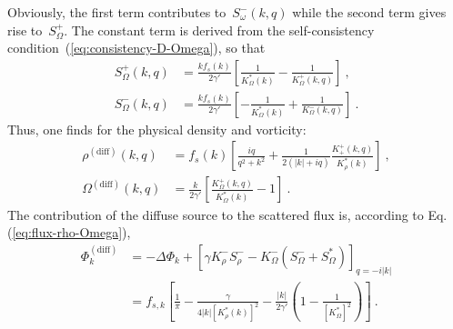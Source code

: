 \documentclass[preprint,aps,eqsecnum]{revtex4-1}
\newcommand{\fplus}[1]{{#1}^{+}}
\newcommand{\fminus}[1]{{#1}^{-}}
\begin{document}
Obviously, the first term contributes to~$\fminus{S}_\omega(k, q)$
while the second term gives rise to~$\fplus{S}_\Omega$. The constant
term is derived from the self-consistency
condition~(\ref{eq:consistency-D-Omega}), so that
\begin{align}
  \fplus{S}_\Omega(k, q) &= \frac{k f_s(k)}{2\gamma'}
  \left[\frac{1}{K^\ast_\Omega(k)} - \frac{1}{\fplus{K}_\Omega(k, q)}
  \right] \ , \\\nonumber
  \fminus{S}_\Omega(k, q) &= \frac{k f_s(k)}{2\gamma'}
  \left[-\frac{1}{K^\ast_\Omega(k)} + \frac{1}{\fminus{K}_\Omega(k, q)}
  \right] \ .
\end{align}
Thus, one finds for the physical density and vorticity:
\begin{align}
  \rho^\mathrm{(diff)}(k, q) &= f_s(k)
  \left[\frac{iq}{q^2 + k^2} + \frac{1}{2(|k| + iq)}
   \frac{\fplus{K}_{+}(k, q)}{K_\rho^\ast(k)}
  \right]
  \ , \\\nonumber
  \Omega^\mathrm{(diff)}(k, q) &= \frac{k}{2\gamma'} \left[
  \frac{\fplus{K}_\Omega(k, q)}{K_\Omega^\ast(k)} - 1
  \right]\ .
\end{align}
The contribution of the diffuse source to
the scattered flux is, according to Eq.(\ref{eq:flux-rho-Omega}),
\begin{align}
  \label{eq:phi-diff}
  \Phi^\mathrm{(diff)}_k &= -\Delta\Phi_{k} + 
  \left[\gamma \fminus{K}_\rho \fminus{S}_\rho
  - \fminus{K}_\Omega \left(\fminus{S}_\Omega
                       + S_\Omega^\ast\right)\right]_{q = -i |k|} \\
    &= f_{s, k} \left[
                       \frac{1}{\pi}
   - \frac{\gamma}{4|k| \left[K_\rho^\ast(k)\right]^2}
  - \frac{|k|}{2\gamma'}\left(1 - \frac{1}{\left[K_\Omega^\ast\right]^2} \right)
   \right]
   \nonumber
  \ .
\end{align}
\end{document}
